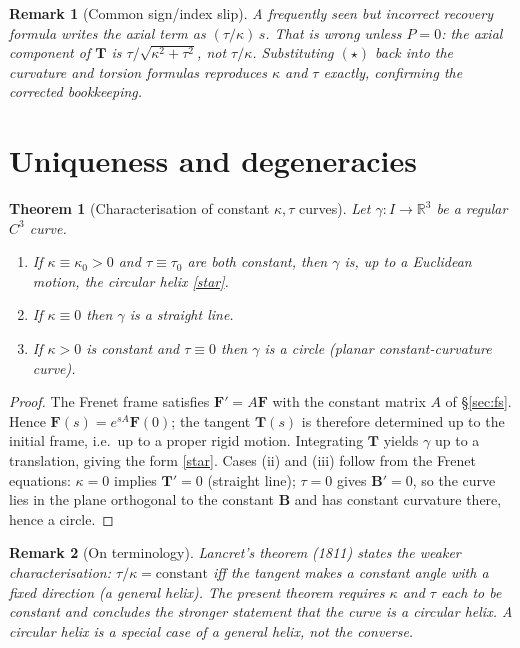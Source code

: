 \documentclass[11pt]{article}
\newtheorem{thm}{Theorem}[section]
\newtheorem{rem}{Remark}[section]
\newcommand{\R}{\mathbb{R}}
\newcommand{\Om}{\sqrt{\kappa^{2}+\tau^{2}}}
\begin{document}
\begin{rem}[Common sign/index slip]
A frequently seen but \emph{incorrect} recovery formula writes the axial term
as $(\tau/\kappa)\,s$. That is wrong unless $P=0$: the axial component of
$\mathbf T$ is $\tau/\Om$, not $\tau/\kappa$. Substituting $(\star)$ back into
the curvature and torsion formulas reproduces $\kappa$ and $\tau$
exactly, confirming the corrected bookkeeping.
\end{rem}

\section{Uniqueness and degeneracies}
\label{sec:uniq}

\begin{thm}[Characterisation of constant $\kappa,\tau$ curves]
\label{thm:main}
Let $\gamma:I\to\R^{3}$ be a regular $C^{3}$ curve.
\begin{enumerate}
\item[(i)] If $\kappa\equiv\kappa_{0}>0$ and $\tau\equiv\tau_{0}$ are both
constant, then $\gamma$ is, up to a Euclidean motion, the circular helix
\eqref{star}.
\item[(ii)] If $\kappa\equiv0$ then $\gamma$ is a straight line.
\item[(iii)] If $\kappa>0$ is constant and $\tau\equiv0$ then $\gamma$ is a
circle (planar constant-curvature curve).
\end{enumerate}
\end{thm}

\begin{proof}
The Frenet frame satisfies $\mathbf F'=A\mathbf F$ with the constant matrix
$A$ of \S\ref{sec:fs}. Hence $\mathbf F(s)=e^{sA}\mathbf F(0)$; the tangent
$\mathbf T(s)$ is therefore determined up to the initial frame, i.e.\ up to a
proper rigid motion. Integrating $\mathbf T$ yields $\gamma$ up to a
translation, giving the form \eqref{star}. Cases (ii) and (iii) follow from the
Frenet equations: $\kappa=0$ implies $\mathbf T'=0$ (straight line);
$\tau=0$ gives $\mathbf B'=0$, so the curve lies in the plane orthogonal to
the constant $\mathbf B$ and has constant curvature there, hence a circle.
\end{proof}

\begin{rem}[On terminology]
Lancret's theorem (1811) states the \emph{weaker} characterisation:
$\tau/\kappa=\text{constant}$ iff the tangent makes a constant angle with a
fixed direction (a \emph{general} helix). The present theorem requires
$\kappa$ and $\tau$ \emph{each} to be constant and concludes the stronger
statement that the curve is a \emph{circular} helix. A circular helix is a
special case of a general helix, not the converse.
\end{rem}
\end{document}
